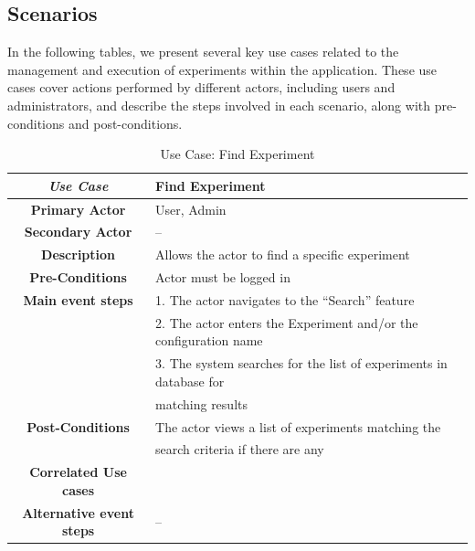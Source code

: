 \subsection{Scenarios}
In the following tables, we present several key use cases related to the management and execution of experiments within the application. These use cases cover actions performed by different actors, including users and administrators, and describe the steps involved in each scenario, along with pre-conditions and post-conditions.
\begin{table}[ht!]
    \centering
    \caption{Use Case: Find Experiment}
    \begin{tabularx}{\textwidth}{|Sl|S{X}|}
        \hline
        \textbf{\textit{Use Case}}       & \textbf{Find Experiment}                                              \\ \hline
        \textbf{Primary Actor}           & User, Admin                                                           \\ \hline
        \textbf{Secondary Actor}         & --                                                                    \\ \hline
        \textbf{Description}             & Allows the actor to find a specific experiment                        \\ \hline
        \textbf{Pre-Conditions}          & Actor must be logged in                                               \\ \hline
        \textbf{Main event steps}        & 1. The actor navigates to the “Search” feature                        \\
                                         & 2. The actor enters the Experiment and/or the configuration name \\
                                         & 3. The system searches for the list of experiments in database for    \\
                                         & matching results                                                      \\ \hline
        \textbf{Post-Conditions}         & The actor views a list of experiments matching the                    \\
                                         & search criteria if there are any                                      \\ \hline
        \textbf{Correlated Use cases}    &                                                                       \\ \hline
        \textbf{Alternative event steps} & --                                                                    \\ \hline
    \end{tabularx}
\end{table}

